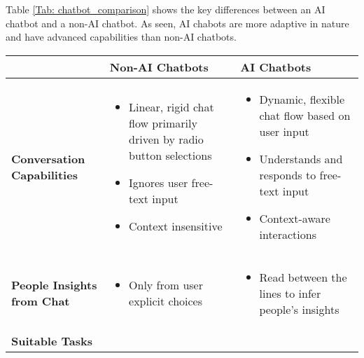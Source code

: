 Table \ref{Tab: chatbot_comparison} shows the key differences between an AI chatbot and a non-AI chatbot. As seen, AI chabots are more adaptive in nature and have advanced capabilities than non-AI chatbots.

\begin{table}[ht]
	\centering
	\begin{adjustbox}{max width=\textwidth}
		\begin{tabular}{|p{3.3cm}|l|l|}
			\hline
			& \textbf{Non-AI Chatbots} & \textbf{AI Chatbots} \\ \hline
			\textbf{Conversation Capabilities} & 
			\begin{minipage}[t]{0.4\textwidth}
				\begin{itemize}
					\item Linear, rigid chat flow primarily driven by radio button selections
					\item Ignores user free-text input
					\item Context insensitive
				\end{itemize}
			\end{minipage} & 
			\begin{minipage}[t]{0.4\textwidth}
				\begin{itemize}
					\item Dynamic, flexible chat flow based on user input
					\item Understands and responds to free-text input
					\item Context-aware interactions
				\end{itemize}
			\end{minipage} \\
			\hline
			\textbf{People Insights from Chat} & 
			\begin{minipage}[t]{0.4\textwidth}
				\begin{itemize}
					\item Only from user explicit choices
				\end{itemize}
			\end{minipage} &
			\begin{minipage}[t]{0.4\textwidth}
				\begin{itemize}
					\item Read between the lines to infer people’s insights
				\end{itemize}
			\end{minipage} \\
			\hline
			\textbf{Suitable Tasks} &
			\begin{minipage}[t]{0.5\textwidth}

\end{minipage}
\end{tabular}
\end{adjustbox}
\end{table}
